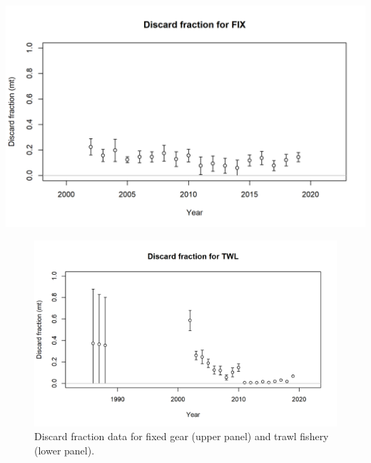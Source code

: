 \documentclass[11pt,
  english,
  a4paper,
]{article}
\begin{document}
\leavevmode\tagmcend\tagstructend\par


\includegraphics[width=1\textwidth,height=0.75\textheight]{figs/discard_dataFIX.png}

\tagmcend\tagstructend


\begin{figure}
\centering
\includegraphics[width=1\textwidth,height=0.75\textheight]{figs/discard_dataTWL.png}
\caption{\label{fig:discardratioTWL} Discard fraction data for fixed gear (upper panel) and trawl fishery (lower panel).}
\end{figure}

\tagmcend\tagstructend

\end{document}
